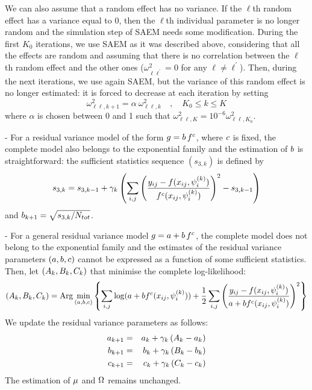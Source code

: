 We can also assume that a random effect has no variance. If the $\ell$th random effect has a variance equal to 0, then the $\ell$th individual parameter is no longer random and the simulation step of SAEM needs some modification. During the first $K_0$ iterations, we use SAEM as it was described above, considering that all the effects are random and assuming that there is no correlation between the $\ell$th random effect and the other ones ($\omega^2_{\ell \ell^\prime}=0$ for any $\ell \neq \ell^\prime$). Then, during the next iterations, we use again SAEM, but the variance of this random effect is no longer estimated: it is forced to decrease at each iteration by setting
\begin{equation}
\omega^2_{\ell\ell,k+1}= \alpha \ {\omega^2_{\ell\ell,k}} \quad , \quad K_0 \leq k \leq K
\end{equation}
where $\alpha$ is chosen between 0 and 1 such that $\omega^2_{\ell\ell,K}= 10^{-6}\omega^2_{\ell\ell,K_0}$.

 - For a  residual variance model of the form $g=  b \, f^c$, where $c$ is fixed, the complete model also belongs to the exponential family and the estimation of $b$ is straightforward:  the sufficient statistics sequence $(s_{3,k})$ is defined by
$$ s_{3,k} =  s_{3,k-1}  + \gamma_k \left(
\sum_{i,j} \left( \frac{y_{ij} - f(x_{ij},{\psi_i^{(k)}})}{f^c (x_{ij},{\psi_i^{(k)}})}  \right) ^2  - s_{3,k-1}
\right) $$ and $b_{k+1} =  \sqrt{ s_{3,k}/ N_{tot} }$.

- For a general residual variance model $g= a + b \, f^c$, the complete model does not belong to the exponential family and the estimates of the residual variance parameters $(a,b,c)$ cannot be expressed as a function of some sufficient statistics. Then, let $(A_k,B_k,C_k)$ that minimise the complete log-likelihood:
$$(A_k, B_k,C_k) = {\rm Arg}\min_{(a,b,c)}
\left\{ \sum_{i,j}\log( a + b f^{c}(x_{ij},{\psi_i^{(k)}}) ) +\frac{1}{2} \sum_{i,j}\left(
\frac{y_{ij} - f(x_{ij},{\psi_i^{(k)}})}{a + b f^{c}(x_{ij},{\psi_i^{(k)}}) } \right)^2 \right\}
$$
We update the residual variance parameters as follows:
 \begin{eqnarray}
a_{k+1} & = & a_{k} +  \gamma_k \left(  A_k - a_{k}  \right)   \\
b_{k+1} & = & b_{k} +  \gamma_k \left(  B_k - b_{k}  \right)   \\
c_{k+1} & = & c_{k} +  \gamma_k \left(  C_k - c_{k}  \right)
\end{eqnarray}
The estimation of $\fixed_effect$ and ${\Omega}$ remains unchanged.


